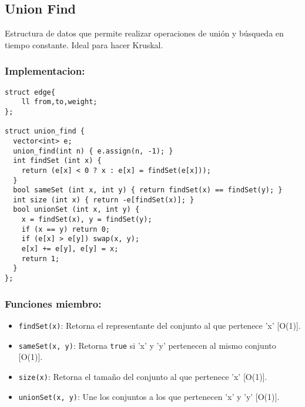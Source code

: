 \subsection{Union Find}
\label{subsec:union_find}
Estructura de datos que permite realizar operaciones de unión y búsqueda en tiempo constante. Ideal para hacer Kruskal.

\subsubsection*{Implementacion:}
\begin{lstlisting}
struct edge{
    ll from,to,weight;
};

struct union_find {
  vector<int> e;
  union_find(int n) { e.assign(n, -1); }
  int findSet (int x) { 
    return (e[x] < 0 ? x : e[x] = findSet(e[x]));
  }
  bool sameSet (int x, int y) { return findSet(x) == findSet(y); }
  int size (int x) { return -e[findSet(x)]; }
  bool unionSet (int x, int y) {
    x = findSet(x), y = findSet(y);
    if (x == y) return 0;
    if (e[x] > e[y]) swap(x, y);
    e[x] += e[y], e[y] = x;
    return 1;
  }
};
\end{lstlisting}

\subsubsection*{Funciones miembro:}
\begin{itemize}
  \item \texttt{findSet(x)}: Retorna el representante del conjunto al que pertenece 'x' [O(1)].
  \item \texttt{sameSet(x, y)}: Retorna \texttt{true} si 'x' y 'y' pertenecen al mismo conjunto [O(1)].
  \item \texttt{size(x)}: Retorna el tamaño del conjunto al que pertenece 'x' [O(1)].
  \item \texttt{unionSet(x, y)}: Une los conjuntos a los que pertenecen 'x' y 'y' [O(1)].
\end{itemize}


